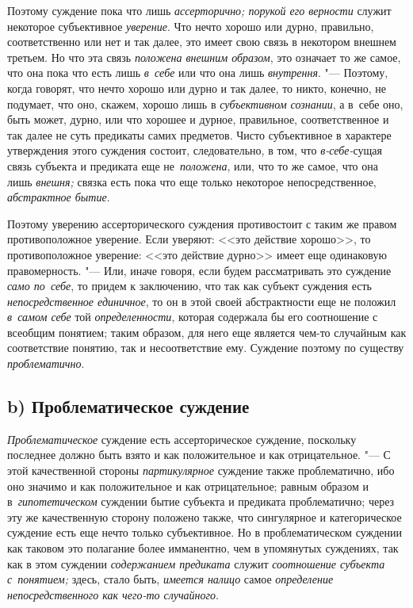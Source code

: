 Поэтому суждение пока что лишь {\em ассерторично; порукой его верности}
служит некоторое субъективное {\em уверение}. Что нечто
хорошо или дурно, правильно, соответственно или нет и так далее, это имеет
свою связь в некотором внешнем третьем. Но что эта связь
{\em положена внешним образом},
это означает то же самое, что она пока что есть лишь
{\em в~себе} или что она лишь {\em внутрення}. "---
Поэтому, когда говорят, что нечто хорошо или дурно и так
далее, то никто, конечно, не подумает, что оно, скажем, хорошо лишь в
{\em субъективном сознании},
а в~себе оно, быть может, дурно, или что хорошее и дурное,
правильное, соответственное и так далее не суть предикаты самих предметов.
Чисто субъективное в характере утверждения этого суждения состоит,
следовательно, в том, что {\em в-себе-}сущая связь субъекта и предиката еще
не~{\em положена}, или, что то же самое, что она лишь {\em внешня;} связка
есть пока что еще только некоторое непосредственное, {\em абстрактное бытие}.

Поэтому уверению ассерторического суждения противостоит с таким
же правом противоположное уверение. Если уверяют: <<это действие
хорошо>>, то противоположное уверение: <<это действие дурно>> имеет еще
одинаковую правомерность. "--- Или, иначе говоря, если будем
рассматривать это суждение {\em само по~себе}, то придем к заключению, что
так как субъект суждения есть {\em непосредственное единичное}, то он в этой
своей абстрактности еще не положил {\em в~самом себе} той {\em определенности},
которая содержала бы его соотношение с всеобщим понятием; таким образом,
для него еще является чем-то случайным как соответствие понятию, так и
несоответствие ему. Суждение поэтому по существу {\em проблематично}.

\subsection[b) Проблематическое суждение]{b) Проблематическое суждение}

{\em Проблематическое} суждение есть ассерторическое суждение, поскольку
последнее должно быть взято и как положительное и как отрицательное. "---
С этой качественной стороны {\em партикулярное}
суждение также проблематично, ибо оно значимо и как
положительное и как отрицательное; равным образом и в~{\em гипотетическом}
суждении бытие субъекта и предиката проблематично; через эту
же качественную сторону положено также, что сингулярное и категорическое
суждение есть еще нечто только субъективное. Но в проблематическом суждении
как таковом это полагание более имманентно, чем в упомянутых суждениях, так
как в этом суждении {\em содержанием предиката} служит {\em соотношение
субъекта с~понятием;} здесь, стало быть, {\em имеется налицо} самое
{\em определение непосредственного как чего-то случайного}.

